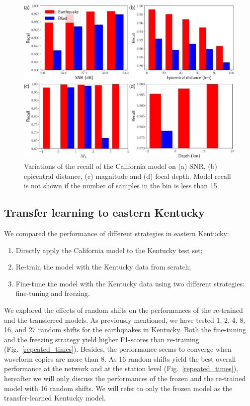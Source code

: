 \documentclass{gji}
\begin{document}
\begin{figure}
\centering
\includegraphics[width=.75\textwidth]{dependencce.pdf}
\caption{Variations of the recall of the California model on (a) SNR, (b) epicentral distance, (c) magnitude and (d) focal depth. Model recall is not shown if the number of samples in the bin is less than 15.}
\label{dependence}
\end{figure}

\subsection{Transfer learning to eastern Kentucky}
We compared the performance of different strategies in eastern Kentucky:
\begin{enumerate}
\renewcommand{\theenumi}{(\arabic{enumi})}
\item Directly apply the California model to the Kentucky test set;
\item Re-train the model with the Kentucky data from scratch;
\item Fine-tune the model with the Kentucky data using two different strategies: fine-tuning and freezing.
\end{enumerate}

We explored the effects of random shifts on the performances of the re-trained and the transferred models. As previously mentioned, we have tested 1, 2, 4, 8, 16, and 27 random shifts for the earthquakes in Kentucky. Both the fine-tuning and the freezing strategy yield higher F1-scores than re-training (Fig.~\ref{repeated_times}). Besides, the performance seems to converge when waveform copies are more than 8. As 16 random shifts yield the best overall performance at the network and at the station level (Fig.~\ref{repeated_times}), hereafter we will only discuss the performances of the frozen and the re-trained model with 16 random shifts. We will refer to only the frozen model as the transfer-learned Kentucky model.
\end{document}
